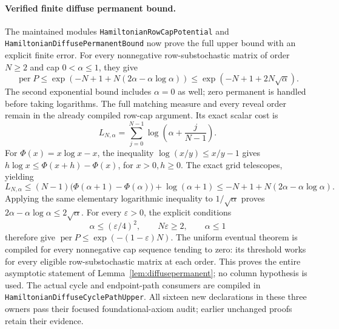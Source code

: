 \paragraph{Verified finite diffuse permanent bound.}
The maintained modules \texttt{HamiltonianRowCapPotential} and
\texttt{HamiltonianDiffusePermanentBound} now prove the full upper
bound with an explicit finite error. For every nonnegative
row-substochastic matrix of order \(N\geq2\) and cap
\(0<\alpha\leq1\), they give
\[
 \operatorname{per}P\leq
 \exp\!\left(-N+1+N(2\alpha-\alpha\log\alpha)\right)
 \leq\exp(-N+1+2N\sqrt{\alpha}).
\]
The second exponential bound includes \(\alpha=0\) as well;
zero permanent is handled before taking logarithms.
The full matching measure and every reveal order remain in the
already compiled row-cap argument. Its exact scalar cost is
\[
 L_{N,\alpha}=\sum_{j=0}^{N-1}
          \log\left(\alpha+\frac{j}{N-1}\right).
\]
For \(\Phi(x)=x\log x-x\), the inequality
\(\log(x/y)\leq x/y-1\) gives
\(h\log x\leq\Phi(x+h)-\Phi(x)\), for \(x>0,h\geq0\).
The exact grid telescopes, yielding
\[
 L_{N,\alpha}\leq
 (N-1)\bigl(\Phi(\alpha+1)-\Phi(\alpha)\bigr)+\log(\alpha+1)
 \leq -N+1+N(2\alpha-\alpha\log\alpha).
\]
Applying the same elementary logarithmic inequality to
\(1/\sqrt{\alpha}\) proves
\(2\alpha-\alpha\log\alpha\leq2\sqrt{\alpha}\).
For every \(\varepsilon>0\), the explicit conditions
\[
 \alpha\leq(\varepsilon/4)^2,\qquad
 N\varepsilon\geq2,\qquad \alpha\leq1
\]
therefore give
\(\operatorname{per}P\leq\exp(-(1-\varepsilon)N)\).
The uniform eventual theorem is compiled for every nonnegative
cap sequence tending to zero: its threshold works for every
eligible row-substochastic matrix at each order.
This proves the entire asymptotic statement of
Lemma~\ref{lem:diffusepermanent}; no column hypothesis is used.
The actual cycle and endpoint-path consumers are compiled in
\texttt{HamiltonianDiffuseCyclePathUpper}. All sixteen new
declarations in these three owners pass their focused
foundational-axiom audit; earlier unchanged proofs retain their evidence.


